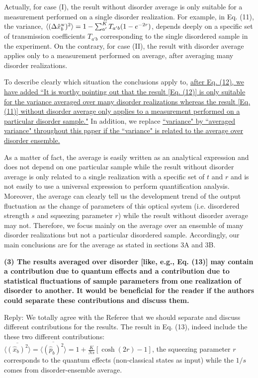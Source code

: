 \documentclass[10pt]{article}
\begin{document}
Actually, for case (I), the result without disorder average is only suitable for a measurement performed on a single disorder realization. For example, in Eq. (11), the variance, $\langle (\Delta \hat{x}_b^{\rm{w}})^2 \rangle = 1 - \sum_{a'}^{K} T_{a'b} (1- e^{-2r})$, depends deeply on a specific set of transmission coefficients $T_{a'b}$ corresponding to the single disordered sample in the experiment. On the contrary, for case (II), the result with disorder average applies only to a measurement performed on average, after averaging many disorder realizations.


To describe clearly which situation the conclusions apply to, {\uline{after Eq. (12), we have added ``It is worthy pointing out that the result [Eq. (12)] is only suitable for the variance averaged over many disorder realizations whereas the result [Eq. (11)] without disorder average only applies to a measurement performed on a particular disorder sample."}} In addition, we replace {\uline{``variance" by ``averaged variance" throughout this paper if the ``variance" is related to the average over disorder ensemble.}}

As a matter of fact, the average is easily written as an analytical expression and does not depend on one particular sample while the result without disorder average is only related to a single realization with a specific set of $t$ and $r$ and is not easily to use a universal expression to perform quantification analysis. Moreover, the average can clearly tell us the development trend of the output fluctuation as the change of parameters of this optical system (i.e. disordered strength $s$ and squeezing parameter $r$) while the result without disorder average may not. Therefore, we focus mainly on the average over an ensemble of many disorder realizations but not a particular disordered sample. Accordingly, our main conclusions are for the average as stated in sections 3A and 3B.


{\bf{(3) The results averaged over disorder [like, e.g., Eq. (13)] may contain a contribution due to quantum effects and a contribution due to statistical fluctuations of sample parameters from one realization of disorder to another. It would be beneficial for the reader if the authors could separate these contributions and discuss them.}}


Reply: We totally agree with the Referee that we should separate and discuss different contributions for the results. The result in Eq. (13), indeed include the these two different contributions: $\overline{\langle (\hat{x}_b)^2\rangle } = \overline{\langle (\hat{p}_b)^2\rangle } = 1 + \frac{K}{Ns} [\cosh(2r) - 1]$, the squeezing parameter $r$ corresponds to the quantum effects (non-classical states as input) while the $1/s$ comes from disorder-ensemble average. 
\end{document}
